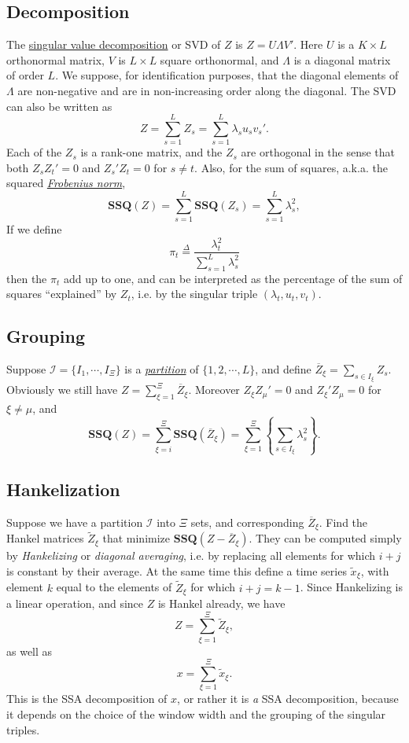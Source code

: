 \documentclass[11pt]{amsart}
\theoremstyle{plain}
\theoremstyle{definition}
\theoremstyle{remark}
\newcommand{\defi}{\mathop{=}\limits^{\Delta}}      %
\begin{document}
\subsection{Decomposition}
The \href{http://en.wikipedia.org/wiki/Singular_value_decomposition}{singular value decomposition} or SVD of \(Z\) is \(Z=U\Lambda V'\). Here \(U\)
is a \(K\times L\) orthonormal matrix, \(V\) is \(L\times L\) square orthonormal, and \(\Lambda\) is a diagonal matrix of order \(L\). We suppose, for identification purposes, that the diagonal elements of \(\Lambda\) are non-negative and are in non-increasing order along the diagonal. The SVD
can also be written as
\[
Z=\sum_{s=1}^L Z_s=\sum_{s=1}^L \lambda_s^{}u_s^{}v_s'.
\]
Each of the \(Z_s\) is a rank-one matrix, and the \(Z_s\) are orthogonal in the sense that both \(Z_s^{}Z_t'=0\) and \(Z_s'Z_t^{}=0\) for \(s\not= t\).
Also, for the sum of squares, a.k.a. the squared \href{http://en.wikipedia.org/wiki/Frobenius_norm#Frobenius_norm}{\emph{Frobenius norm}},
\[
\mathbf{SSQ}(Z)=\sum_{s=1}^L\mathbf{SSQ}(Z_s)=\sum_{s=1}^L\lambda_s^2,
\]
If we define
\[
\pi_t\defi\frac{\lambda_t^2}{\sum_{s=1}^L\lambda_s^2}
\]
then the \(\pi_t\) add up to one, and can be interpreted as the percentage of the sum of squares ``explained'' by \(Z_t\), i.e. by the
singular triple \((\lambda_t,u_t,v_t)\).
\subsection{Grouping}

Suppose \(\mathcal{I}=\{I_1,\cdots,I_\Xi\}\) is a \href{http://en.wikipedia.org/wiki/Partition_of_a_set}{\emph{partition}} of \(\{1,2,\cdots,L\}\), and define
\(\overline{Z}_\xi=\sum_{s\in I_\xi} Z_s\). Obviously we still have \(Z=\sum_{\xi=1}^\Xi\overline{Z}_\xi\). Moreover \(Z_\xi^{}Z_\mu'=0\) and \(Z_\xi'Z_\mu^{}=0\) for
\(\xi\not=\mu\), and
\[
\mathbf{SSQ}(Z)=\sum_{\xi=i}^\Xi\mathbf{SSQ}(\overline{Z}_\xi)=\sum_{\xi=1}^\Xi\left\{\sum_{s\in I_\xi}\lambda_s^2\right\}.
\]
\subsection{Hankelization}
Suppose we have a partition \(\mathcal{I}\) into \(\Xi\) sets, and corresponding \(\overline{Z}_\xi\). Find the Hankel matrices \(\tilde Z_\xi\) that
minimize \(\mathbf{SSQ}(Z-\overline{Z}_\xi)\). They can be computed simply by \emph{Hankelizing} or \emph{diagonal averaging}, i.e. by replacing all elements
for which \(i+j\) is constant by their average. At the same time this define a time series \(\tilde x_\xi\), with element \(k\) equal to the elements of
\(\tilde Z_\xi\) for which \(i+j=k-1\). Since Hankelizing is a linear operation, and since \(Z\) is Hankel already, we have
\[
Z=\sum_{\xi=1}^\Xi\tilde Z_\xi,
\]
as well as
\[
x=\sum_{\xi=1}^\Xi\tilde x_\xi.
\]
This is the SSA decomposition of \(x\), or rather it is \emph{a} SSA decomposition, because it depends on the choice of the window width and the grouping of the singular triples.
\end{document}
